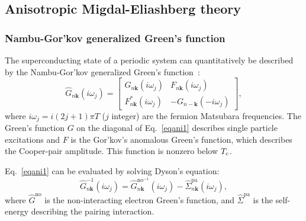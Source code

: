 \documentclass[final,3p,times,twocolumn]{elsarticle}
\begin{document}
\subsection{Anisotropic Migdal-Eliashberg theory}\label{eliash}   

\subsubsection{Nambu-Gor'kov generalized Green's function}

The superconducting state of a periodic system can quantitatively be described by the Nambu-Gor'kov generalized Green's function~\cite{Gorkov1958,Nambu1960,Garland1967,Allen1983a,Carbotte1990,Choi2003,Margine2013}:
\begin{equation}\label{eqani1}
\hat{G}_{n\mathbf{k}} (i\omega_j) = 
\begin{bmatrix}
G_{n\mathbf{k}} (i\omega_j) & F_{n\mathbf{k}} (i\omega_j) \\
F_{n\mathbf{k}}^* (i\omega_j) & -G_{n-\mathbf{k}} (-i\omega_j) 
\end{bmatrix},
\end{equation}
where $i\omega_j = i(2j+1)\pi T$ ($j$ integer) are the fermion Matsubara frequencies. 
The Green's function $G$ on the diagonal of Eq.~\eqref{eqani1} describes
 single particle excitations and $F$ is the Gor'kov's anomalous Green's function, which describes the Cooper-pair amplitude. This function is nonzero below $T_{\rm c}$.

Eq.~\eqref{eqani1} can be evaluated by solving Dyson's equation:
\begin{equation}\label{dyson}
\hat{G}_{n\mathbf{k}}^{-1} (i\omega_j) = \hat{G}_{n\mathbf{k}}^{\text{no}^{-1}} (i\omega_j)  - \hat{\Sigma}_{n\mathbf{k}}^{\text{pa}} (i\omega_j), 
\end{equation}
where $\hat{G}^{\text{no}}$ is the non-interacting electron Green's function, and $\hat{\Sigma}^{\text{pa}}$ is the self-energy describing the pairing interaction.  
\end{document}
